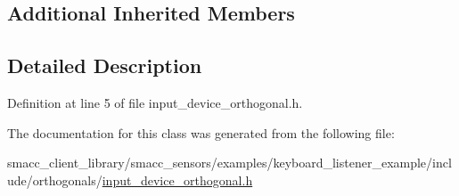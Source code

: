 \subsection*{Additional Inherited Members}


\subsection{Detailed Description}


Definition at line 5 of file input\+\_\+device\+\_\+orthogonal.\+h.



The documentation for this class was generated from the following file\+:\begin{DoxyCompactItemize}
\item 
smacc\+\_\+client\+\_\+library/smacc\+\_\+sensors/examples/keyboard\+\_\+listener\+\_\+example/include/orthogonals/\hyperlink{input__device__orthogonal_8h}{input\+\_\+device\+\_\+orthogonal.\+h}\end{DoxyCompactItemize}
